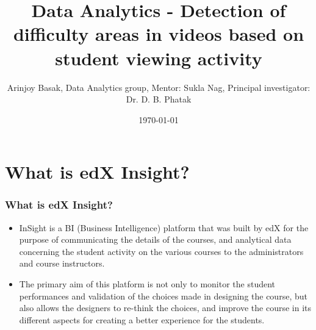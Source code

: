 \documentclass[12pt,xcolor=dvipsnames]{beamer}
\title{Data Analytics - Detection of difficulty areas in videos based on student viewing activity}
\author{Arinjoy Basak, Data Analytics group, Mentor: Sukla Nag, Principal investigator: Dr. D. B. Phatak}
\date{\today}
\begin{document}
\begin{frame}
\titlepage
\end{frame}




\section{What is edX Insight?}
\begin{frame}[t]
\frametitle{What is edX Insight?}

\begin{itemize}

\item InSight is a BI (Business Intelligence) platform that was built by edX for the purpose of communicating
the details of the courses, and analytical data concerning the student activity on the various courses to
the administrators and course instructors.\\

\item The primary aim of this platform is not only to monitor the
student performances and validation of the choices made in designing the course, but also allows the
designers to re-think the choices, and improve the course in its different aspects for creating a better
experience for the students.

\end{itemize}

\end{frame}
\end{document}
